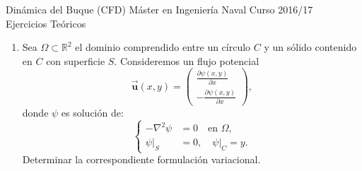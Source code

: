 \documentclass{article}
\newcommand{\Rset}{\mathbb{R}}
\newcommand{\uu}{\vec{\mathbf{u}}}
\newcommand{\dx}[1]{\frac{\partial #1}{\partial x}}
\newcommand{\dy}[1]{\frac{\partial #1}{\partial x}}
\newcommand{\laplace}{\nabla^2}
\begin{document}
\begin{titlepage}
  \begin{center}
    Dinámica del Buque (CFD) \hfill Máster en Ingeniería Naval \hfill
    Curso 2016/17
    \\[2em]
    {\LARGE Ejercicios Teóricos}
\end{center}

\bigskip

\begin{enumerate}
\item Sea $\Omega\subset \Rset^2$ el dominio comprendido entre un
  círculo $C$ y un sólido contenido en $C$ con superficie
  $S$. Consideremos un flujo potencial
  $$
  \uu(x,y)=
  \left(
    \begin{array}{r}
      \dy{\psi(x,y)} \\ [0.5em]
      -\dx{\psi(x,y)}
    \end{array}
  \right),
  $$
  donde $\psi$ es solución de:
  \begin{equation*}
   \left\{
     \begin{aligned}
       -\laplace\psi &=0 \quad \text{en } \Omega ,\\
       \psi|_S &=0, \quad \psi|_C= y.
     \end{aligned}
   \right.
 \end{equation*}
 Determinar la correspondiente formulación variacional.


\end{enumerate}
\end{titlepage}
\end{document}
